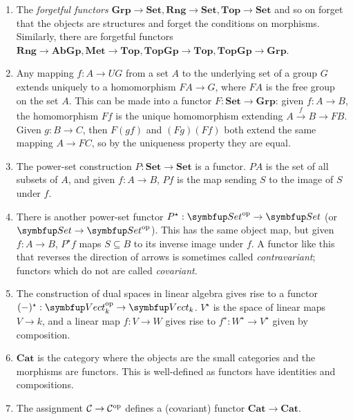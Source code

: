 \begin{example}
    \begin{enumerate}
        \item The \emph{forgetful functors} \( \mathbf{Grp} \to \mathbf{Set}, \mathbf{Rng} \to \mathbf{Set}, \mathbf{Top} \to \mathbf{Set} \) and so on forget that the objects are structures and forget the conditions on morphisms.
        Similarly, there are forgetful functors \( \mathbf{Rng} \to \mathbf{AbGp}, \mathbf{Met} \to \mathbf{Top}, \mathbf{TopGp} \to \mathbf{Top}, \mathbf{TopGp} \to \mathbf{Grp} \).
        \item Any mapping \( f : A \to UG \) from a set \( A \) to the underlying set of a group \( G \) extends uniquely to a homomorphism \( FA \to G \), where \( FA \) is the free group on the set \( A \).
        This can be made into a functor \( F : \mathbf{Set} \to \mathbf{Grp} \): given \( f : A \to B \), the homomorphism \( Ff \) is the unique homomorphism extending \( A \xrightarrow f B \to FB \).
        Given \( g : B \to C \), then \( F(gf) \) and \( (Fg)(Ff) \) both extend the same mapping \( A \to FC \), so by the uniqueness property they are equal.
        \item The power-set construction \( P : \mathbf{Set} \to \mathbf{Set} \) is a functor.
        \( PA \) is the set of all subsets of \( A \), and given \( f : A \to B \), \( Pf \) is the map sending \( S \) to the image of \( S \) under \( f \).
        \item There is another power-set functor \( P^\star : \mathbf{Set}^\cop \to \mathbf{Set} \) (or \( \mathbf{Set} \to \mathbf{Set}^\cop \)).
        This has the same object map, but given \( f : A \to B \), \( P^\star f \) maps \( S \subseteq B \) to its inverse image under \( f \).
        A functor like this that reverses the direction of arrows is sometimes called \emph{contravariant}; functors which do not are called \emph{covariant}.
        \item The construction of dual spaces in linear algebra gives rise to a functor \( (-)^\star : \mathbf{Vect}_k^\cop \to \mathbf{Vect}_k \).
        \( V^\star \) is the space of linear maps \( V \to k \), and a linear map \( f : V \to W \) gives rise to \( f^\star : W^\star \to V^\star \) given by composition.
        \item \( \mathbf{Cat} \) is the category where the objects are the small categories and the morphisms are functors.
        This is well-defined as functors have identities and compositions.
        \item The assignment \( \mathcal C \to \mathcal C^{\mathrm{op}} \) defines a (covariant) functor \( \mathbf{Cat} \to \mathbf{Cat} \).

\end{enumerate}
\end{example}
